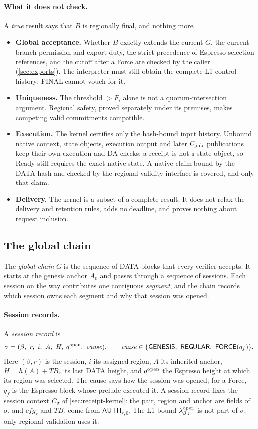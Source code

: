\documentclass[11pt,a4paper]{article}
\newcommand{\TB}{\mathit{TB}}
\newcommand{\tagg}[1]{\ensuremath{\mathsf{#1}}}
\newcommand{\defterm}[1]{\textcolor{rrBlue}{\textit{#1}}}
\begin{document}
\paragraph{What it does not check.}
A \emph{true} result says that $B$ is regionally final, and nothing more.
\begin{itemize}[itemsep=2pt]
\item \textbf{Global acceptance.} Whether $B$ exactly extends the
current $G$, the current branch permission and export duty, the strict
precedence of Espresso selection references, and the cutoff after a
Force are checked by the caller (\cref{sec:exports}). The interpreter
must still obtain the complete L1 control history; FINAL cannot vouch
for it.
\item \textbf{Uniqueness.} The threshold $>F_i$ alone is not a
quorum-intersection argument. Regional safety, proved separately under
its premises, makes competing valid commitments compatible.
\item \textbf{Execution.} The kernel certifies only the hash-bound
input history. Unbound native context, state objects, execution output
and later $C_{\rm pub}$ publications keep their own execution and DA
checks; a receipt is not a state object, so Ready still requires the
exact native state. A native claim bound by the DATA hash and checked by
the regional validity interface is covered, and only that claim.
\item \textbf{Delivery.} The kernel is a subset of a complete result.
It does not relax the delivery and retention rules, adds no deadline,
and proves nothing about request inclusion.
\end{itemize}

\subsection{The global chain}
\label{sec:global-finality}
\label{sec:global-chain}
The \defterm{global chain} $G$ is the sequence of DATA blocks that every
verifier accepts. It starts at the genesis anchor $A_0$ and passes
through a sequence of sessions. Each session on the way contributes one
contiguous \defterm{segment}, and the chain records which session owns
each segment and why that session was opened.

\paragraph{Session records.}
A \defterm{session record} is
\[
 \sigma=(\beta,\ r,\ i,\ A,\ H,\ q^{\rm open},\ \mathit{cause}),\qquad
 \mathit{cause}\in\{\tagg{GENESIS},\ \tagg{REGULAR},\ \tagg{FORCE}(q_f)\}.
\]
Here $(\beta,r)$ is the session, $i$ its assigned region, $A$ its
inherited anchor, $H=h(A)+\TB_r$ its last DATA height, and
$q^{\rm open}$ the Espresso height at which its region was selected. The
cause says how the session was opened; for a Force, $q_f$ is the Espresso
block whose prelude executed it. A session record fixes the session
context $C_\sigma$ of \cref{sec:receipt-kernel}: the pair, region and
anchor are fields of $\sigma$, and $\mathit{cfg}_r$ and $\TB_r$ come from
$\tagg{AUTH}_{r,0}$. The L1 bound $\lambda^{\rm open}_{\beta,r}$ is not
part of $\sigma$; only regional validation uses it.
\end{document}
